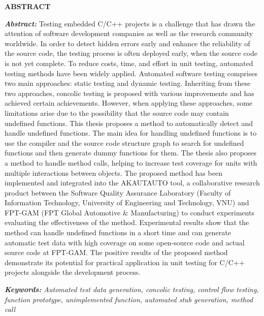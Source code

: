 \newpage
{}
\begin{center}
    \textbf{ABSTRACT}
\end{center}
\changefontsizes[16pt]{12pt}
\textit{\textbf{Abstract: }} 
Testing embedded C/C++ projects is a challenge that has drawn the attention of software development companies as well as the research community worldwide. In order to detect hidden errors early and enhance the reliability of the source code, the testing process is often deployed early, when the source code is not yet complete. To reduce costs, time, and effort in unit testing, automated testing methods have been widely applied. Automated software testing comprises two main approaches: static testing and dynamic testing. Inheriting from these two approaches, concolic testing is proposed with various improvements and has achieved certain achievements. However, when applying these approaches, some limitations arise due to the possibility that the source code may contain undefined functions. This thesis proposes a method to automatically detect and handle undefined functions. The main idea for handling undefined functions is to use the compiler and the source code structure graph to search for undefined functions and then generate dummy functions for them. The thesis also proposes a method to handle method calls, helping to increase test coverage for units with multiple interactions between objects. The proposed method has been implemented and integrated into the AKAUTAUTO tool, a collaborative research product between the Software Quality Assurance Laboratory (Faculty of Information Technology, University of Engineering and Technology, VNU) and FPT-GAM (FPT Global Automotive \& Manufacturing) to conduct experiments evaluating the effectiveness of the method. Experimental results show that the method can handle undefined functions in a short time and can generate automatic test data with high coverage on some open-source code and actual source code at FPT-GAM. The positive results of the proposed method demonstrate its potential for practical application in unit testing for C/C++ projects alongside the development process.

\vspace{-0.5cm}
\begin{flushleft}
  \textit{\textbf{Keywords: } Automated test data generation, concolic testing, control flow testing, function prototype, unimplemented function, automated stub generation, method call}
\end{flushleft}
\changefontsizes[16pt]{13pt}
